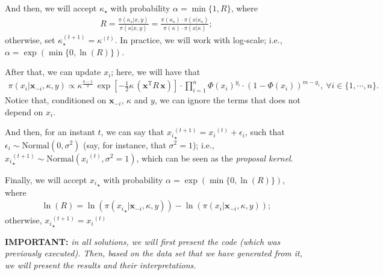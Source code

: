 \documentclass[12pt]{article}\usepackage[]{graphicx}\usepackage[]{color}
\begin{document}
And then, we will accept $\kappa_{\star}$ with probability $\alpha = \min\{1, R\}$, where
\begin{align*}
R = \frac{\pi(\kappa_{\star}|x, y)}{\pi(\kappa|x, y)} = \frac{\pi(\kappa_{\star}) \cdot \pi(x|\kappa_{\star})}{\pi(\kappa) \cdot \pi(x|\kappa)};
\end{align*}
otherwise, set $\kappa_{\star}^{(t + 1)} = \kappa^{(t)}$. In practice, we will work with log-scale; i.e., $\alpha = \exp(\min\{0, \ln(R)\})$.

After that, we can update $x_i$; here, we will have that
\begin{align*}
\pi(x_i|\boldsymbol{x}_{-i}, \kappa, y) \propto \kappa^{\frac{n - 1}{2}} \, \exp\left[-\frac{1}{2} \kappa  \, (\boldsymbol{x}^{\text{T}} R \, \boldsymbol{x}) \right] \cdot \prod_{i = 1}^{n} \Phi(x_i)^{y_i} \cdot (1 - \Phi(x_i))^{m - y_i},  ~\forall i \in \{1, \cdots, n\}.
\end{align*}
Notice that, conditioned on $\boldsymbol{x}_{-i}$, $\kappa$ and $y$, we can ignore the terms that does not depend on $x_i$.

And then, for an instant $t$, we can say that ${x_i}_{\star}^{(t+1)} = {x_i}^{(t)} + \epsilon_i$, such that $\epsilon_i \sim \text{Normal}(0, \sigma^2)$ (say, for instance, that $\sigma^2 = 1$); i.e., ${x_i}_{\star}^{(t+1)} \sim \text{Normal}({x_i}^{(t)}, \sigma^2 = 1)$, which can be seen as the \textit{proposal kernel}.

Finally, we will accept ${x_i}_{\star}$ with probability $\alpha = \exp(\min\{0, \ln(R)\})$, where
\begin{align*}
\ln(R) = \ln(\pi({x_i}_{\star} | \boldsymbol{x}_{-i}, \kappa, y)) - \ln(\pi({x_i} | \boldsymbol{x}_{-i}, \kappa, y));
\end{align*}
otherwise, ${x_i}_{\star}^{(t+1)} = {x_i}^{(t)}$

\vspace{12pt}
\textbf{IMPORTANT:} \textit{in all solutions, we will first present the code (which was previously executed). Then, based on the data set that we have generated from it, we will present the results and their interpretations.}
\end{document}

